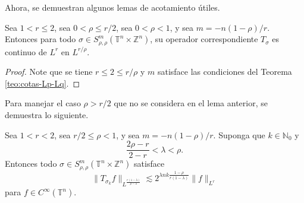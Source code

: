 Ahora, se demuestran algunos lemas de acotamiento útiles.
\begin{lemma}
	Sea $1 < r \leq 2$, sea $0<\rho\leq r/2$, sea $0<\rho<1$, y sea $m = -n(1-\rho)/r$. Entonces para todo $\sigma \in S^m_{\rho,\rho}(\mathbb{T}^n \times \mathbb{Z}^n) $, su operador correspondiente $T_\sigma$ es continuo de $L^r$ en $L^{r/\rho}$.
	\label{lem:Lr-Lr/rho-boundedness}
\end{lemma}
\begin{proof}
	Note que se tiene $r\leq 2 \leq r/\rho$ y $m$ satisface las condiciones del Teorema \ref{teo:cotas-Lp-Lq}.
\end{proof}
Para manejar el caso $\rho > r/2$ que no se considera en el lema anterior, se demuestra lo siguiente.
\begin{lemma}
	Sea $1<r<2$, sea $r/2\leq\rho<1$, y sea $m=-n(1-\rho)/r$. Suponga que $k\in\mathbb{N}_0$ y 
	\begin{equation*}
		\frac{2\rho-r}{2-r} < \lambda < \rho.
	\end{equation*}
	Entonces todo $\sigma \in S^m_{\rho,\rho}(\mathbb{T}^n \times \mathbb{Z}^n) $ satisface 
	\begin{equation*}
		\|T_{\sigma_k}f\|_{L^{\frac{r(1-\lambda)}{\rho-\lambda}} } \lesssim 2^{\lambda nk \frac{1-\rho}{r(1-\lambda)}} \|f\|_{L^r}
	\end{equation*}
	para $f\in C^\infty(\mathbb{T}^n)$.
	\label{lem:Lr-lambda-boundedness}
\end{lemma}
